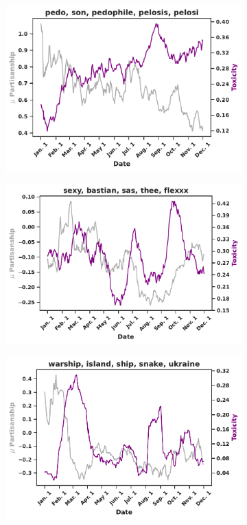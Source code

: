\begin{figure}
\begin{subfigure}[l]{0.32\textwidth}
\end{subfigure}
\begin{subfigure}[l]{0.32\textwidth}
\includegraphics[width=1\columnwidth]{figures/pedo-toxic-swing-final-20240425.pdf} 
\caption{}
\label{fig:pedo}
\end{subfigure}
\begin{subfigure}[l]{0.32\textwidth}
\includegraphics[width=1\columnwidth]{figures/sexy-toxic-swing-final-20240425.pdf} 
\caption{}
\label{fig:sexy}
\end{subfigure}
\begin{subfigure}[l]{0.32\textwidth}
\includegraphics[width=1\columnwidth]{figures/warship-toxic-swing-final-20240425.pdf} 

\end{subfigure}
\end{figure}
